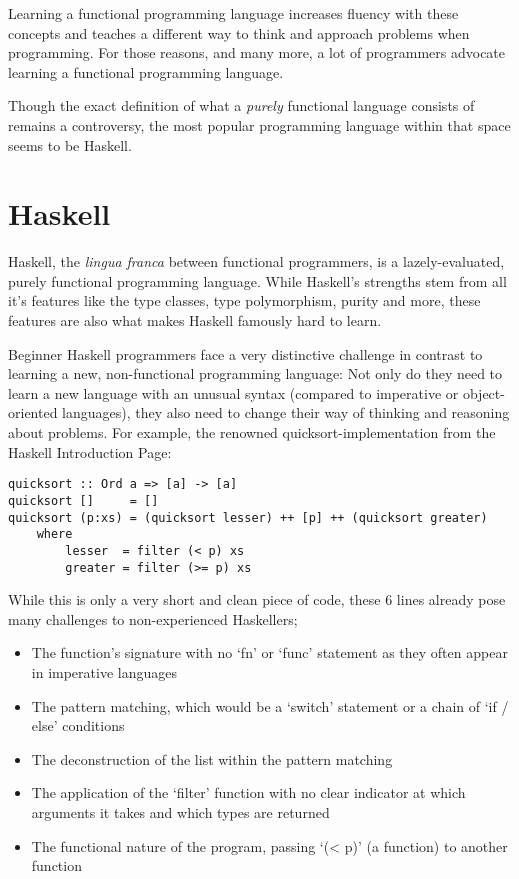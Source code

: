 Learning a functional programming language increases fluency with these concepts and teaches a different
way to think and approach problems when programming. For those reasons, and many more, a lot of programmers
advocate learning a functional programming language.

Though the exact definition of what a \textit{purely} functional language consists of remains a controversy\cite{functional-controversy},
the most popular programming language within that space seems to be Haskell\cite{comparison-functional-languages}.

\section{Haskell}

Haskell, the \textit{lingua franca} between functional programmers, is a lazely-evaluated, purely functional programming
language. While Haskell's strengths stem from all it's features like the type classes, type polymorphism, purity and more,
these features are also what makes Haskell famously hard to learn\cite{haskell-hard-one}\cite{haskell-hard-two}\cite{haskell-hard-three}\cite{haskell-hard-four}.

Beginner Haskell programmers face a very distinctive challenge in contrast to learning a new, non-functional programming language:
Not only do they need to learn a new language with an unusual syntax (compared to imperative or object-oriented languages), they
also need to change their way of thinking and reasoning about problems.
For example, the renowned quicksort-implementation from the Haskell Introduction Page\cite{haskell-quicksort}:

\begin{verbatim}
quicksort :: Ord a => [a] -> [a]
quicksort []     = []
quicksort (p:xs) = (quicksort lesser) ++ [p] ++ (quicksort greater)
    where
        lesser  = filter (< p) xs
        greater = filter (>= p) xs
\end{verbatim}

While this is only a very short and clean piece of code, these 6 lines already pose many challenges to non-experienced Haskellers;

\begin{itemize}
    \item The function's signature with no `fn' or `func' statement as they often appear in imperative languages
    \item The pattern matching, which would be a `switch' statement or a chain of `if / else' conditions
    \item The deconstruction of the list within the pattern matching
    \item The application of the `filter' function with no clear indicator at which arguments it takes and which types are returned
    \item The functional nature of the program, passing `(< p)' (a function) to another function
\end{itemize}

